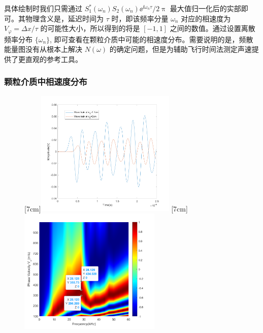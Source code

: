 具体绘制时我们只需通过 $S_{1}^{*}(\omega_{n})S_{2}(\omega_{n}){\ee}^{\ii\omega_{n}\tau}/2\uppi$ 最大值归一化后的实部即可。其物理含义是，延迟时间为 $\tau$ 时，即该频率分量 $\omega_{n}$ 对应的相速度为 $V_{\varphi} = \Delta x/\tau$ 的可能性大小，所以得到的将是 $[-1,1]$ 之间的数值。通过设置离散频率分布 $\{\omega_{n}\}$, 即可查看在颗粒介质中可能的相速度分布。需要说明的是，频散能量图没有从根本上解决 $N(\omega)$ 的确定问题，但是为辅助飞行时间法测定声速提供了更直观的参考工具。

\subsubsection{颗粒介质中相速度分布}


\begin{figure}[!hbtp]
  \centering
                [7cm]{\includegraphics[height=6cm]{figures/2_wave_train.png}}
  \hspace{1cm}
                [7cm]{\includegraphics[height=6cm]{figures/2_cwt_v_phi.png}}
  \label{fig:dispersion_energy}
\end{figure}

